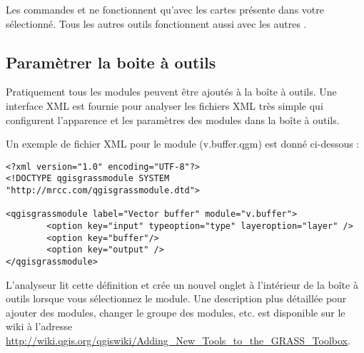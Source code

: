 Les commandes  et  ne fonctionnent qu'avec les cartes présente dans votre  sélectionné. Tous les autres outils fonctionnent aussi avec les autres .

\subsection{Paramètrer la boite à outils \grass} 
\label{sec:toolbox-customizing}

Pratiquement tous les modules \grass peuvent être ajoutés à la boîte à outils. Une interface XML est fournie pour analyser les fichiers XML 
très simple qui configurent l'apparence et les paramètres des modules dans la boîte à outils.

Un exemple de fichier XML pour le module  (v.buffer.qgm) est donné ci-dessous :
\begin{verbatim}
<?xml version="1.0" encoding="UTF-8"?>
<!DOCTYPE qgisgrassmodule SYSTEM "http://mrcc.com/qgisgrassmodule.dtd">

<qgisgrassmodule label="Vector buffer" module="v.buffer">
        <option key="input" typeoption="type" layeroption="layer" />
        <option key="buffer"/>
        <option key="output" />
</qgisgrassmodule>
\end{verbatim}
%
L'analyseur lit cette définition et crée un nouvel onglet à l'intérieur de la boîte à outils lorsque vous sélectionnez le module. Une description plus détaillée pour ajouter des modules, changer le groupe des modules, etc. est disponible sur le wiki \qg à l'adresse \url{http://wiki.qgis.org/qgiswiki/Adding_New_Tools_to_the_GRASS_Toolbox}.
